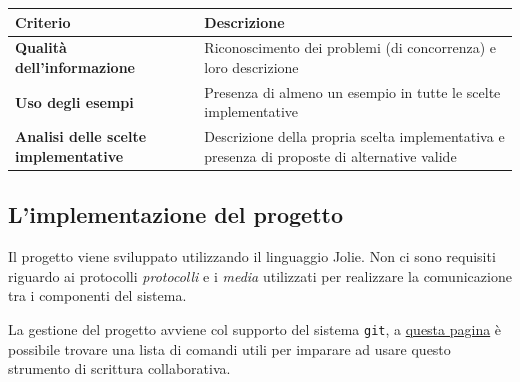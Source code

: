 \documentclass[
]{article}
\begin{document}
\begin{longtable}[]{@{}ll@{}}
\toprule
\begin{minipage}[b]{0.47\columnwidth}\raggedright
Criterio\strut
\end{minipage} & \begin{minipage}[b]{0.47\columnwidth}\raggedright
Descrizione\strut
\end{minipage}\tabularnewline
\midrule
\endhead
\begin{minipage}[t]{0.47\columnwidth}\raggedright
\textbf{Qualità dell'informazione}\strut
\end{minipage} & \begin{minipage}[t]{0.47\columnwidth}\raggedright
Riconoscimento dei problemi (di concorrenza) e loro descrizione\strut
\end{minipage}\tabularnewline
\begin{minipage}[t]{0.47\columnwidth}\raggedright
\textbf{Uso degli esempi}\strut
\end{minipage} & \begin{minipage}[t]{0.47\columnwidth}\raggedright
Presenza di almeno un esempio in tutte le scelte implementative\strut
\end{minipage}\tabularnewline
\begin{minipage}[t]{0.47\columnwidth}\raggedright
\textbf{Analisi delle scelte implementative}\strut
\end{minipage} & \begin{minipage}[t]{0.47\columnwidth}\raggedright
Descrizione della propria scelta implementativa e presenza di proposte
di alternative valide\strut
\end{minipage}\tabularnewline
\bottomrule
\end{longtable}

\hypertarget{limplementazione-del-progetto}{%
\subsection{L'implementazione del
progetto}\label{limplementazione-del-progetto}}

Il progetto viene sviluppato utilizzando il linguaggio Jolie. Non ci
sono requisiti riguardo ai protocolli \emph{protocolli} e i \emph{media}
utilizzati per realizzare la comunicazione tra i componenti del sistema.

La gestione del progetto avviene col supporto del sistema \texttt{git},
a
\href{https://education.github.com/git-cheat-sheet-education.pdf}{questa
pagina} è possibile trovare una lista di comandi utili per imparare ad
usare questo strumento di scrittura collaborativa.
\end{document}
